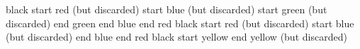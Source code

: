 \documentclass{article}
\begin{document}
black
\newpage
\AtBeginShipoutNext{\AtBeginShipoutDiscard}
{\color{red}
 start red (but discarded)
\newpage
 \AtBeginShipoutNext{\AtBeginShipoutDiscard}
 {\color{blue}
  start blue (but discarded)
\newpage
  \AtBeginShipoutNext{\AtBeginShipoutDiscard}
  {\color{green}
   start green (but discarded)
\newpage
   end green}
\newpage
  end blue}
\newpage
 end red}
\newpage
black
\newpage
\AtBeginShipoutNext{\AtBeginShipoutDiscard}
{\color{red}
 start red (but discarded)
 {\color{blue}
  start blue (but discarded)
\newpage
  end blue}
 end red}
\newpage
black
\newpage
{\color{yellow}
 start yellow
\newpage
 \AtBeginShipoutNext{\AtBeginShipoutDiscard}
 end yellow (but discarded)}
\end{document}
